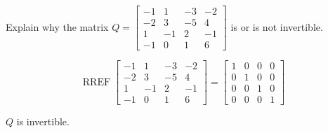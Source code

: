
\begin{exerciseStatement}


Explain why the matrix \(Q= \left[\begin{array}{cccc}
-1 & 1 & -3 & -2 \\
-2 & 3 & -5 & 4 \\
1 & -1 & 2 & -1 \\
-1 & 0 & 1 & 6
\end{array}\right] \) is or is not invertible.


\end{exerciseStatement}
    
\begin{exerciseAnswer} 


\[\operatorname{RREF} \left[\begin{array}{cccc}
-1 & 1 & -3 & -2 \\
-2 & 3 & -5 & 4 \\
1 & -1 & 2 & -1 \\
-1 & 0 & 1 & 6
\end{array}\right] = \left[\begin{array}{cccc}
1 & 0 & 0 & 0 \\
0 & 1 & 0 & 0 \\
0 & 0 & 1 & 0 \\
0 & 0 & 0 & 1
\end{array}\right] \]

\(Q\) is invertible.
\end{exerciseAnswer}
    
